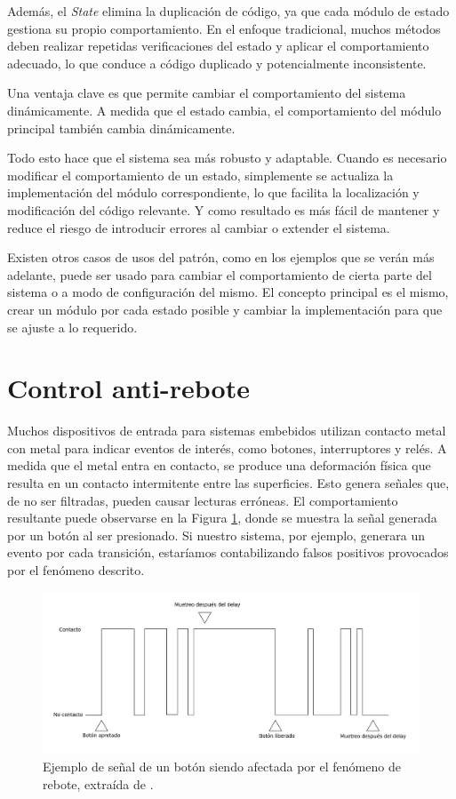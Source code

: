 Además, el \textit{State} elimina la duplicación de código, ya que cada módulo de estado gestiona su propio comportamiento. En el enfoque tradicional, muchos métodos deben realizar repetidas verificaciones del estado y aplicar el comportamiento adecuado, lo que conduce a código duplicado y potencialmente inconsistente.

Una ventaja clave es que permite cambiar el comportamiento del sistema dinámicamente. A medida que el estado cambia, el comportamiento del módulo principal también cambia dinámicamente. 

Todo esto hace que el sistema sea más robusto y adaptable. Cuando es necesario modificar el comportamiento de un estado, simplemente se actualiza la implementación del módulo correspondiente, lo que facilita la localización y modificación del código relevante. Y como resultado es más fácil de mantener y reduce el riesgo de introducir errores al cambiar o extender el sistema.

Existen otros casos de usos del patrón, como en los ejemplos que se verán más adelante, puede ser usado para cambiar el comportamiento de cierta parte del sistema o a modo de configuración del mismo. El concepto principal es el mismo, crear un módulo por cada estado posible y cambiar la implementación para que se ajuste a lo requerido.

\section{Control anti-rebote}
Muchos dispositivos de entrada para sistemas embebidos utilizan contacto metal con metal para indicar eventos de interés, como botones, interruptores y relés. A medida que el metal entra en contacto, se produce una deformación física que resulta en un contacto intermitente entre las superficies. Esto genera señales que, de no ser filtradas, pueden causar lecturas erróneas. El comportamiento resultante puede observarse en la Figura \ref{botonReboteD}, donde se muestra la señal generada por un botón al ser presionado. Si nuestro sistema, por ejemplo, generara un evento por cada transición, estaríamos contabilizando falsos positivos provocados por el fenómeno descrito.

\begin{figure}[H]
    \centering
    \includegraphics[width=0.9\linewidth]{antirebote.png}
    \caption{Ejemplo de señal de un botón siendo afectada por el fenómeno de rebote, extraída de \citep{douglass}.}
    \label{botonReboteD}
\end{figure}

